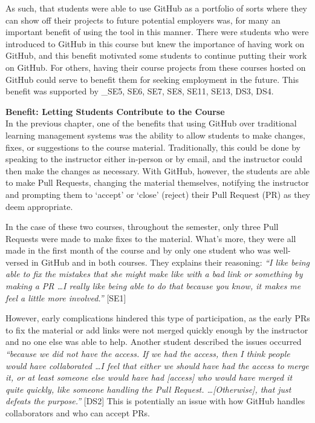 As such, that students were able to use GitHub as a portfolio of sorts where they can show off their projects to future potential employers was, for many an important benefit of using the tool in this manner. There were students who were introduced to GitHub in this course but knew the importance of having work on GitHub, and this benefit motivated some students to continue putting their work on GitHub. For others, having their course projects from these courses hosted on GitHub could serve to benefit them for seeking employment in the future. This benefit was supported by _{SE5, SE6, SE7, SE8, SE11, SE13, DS3, DS4}.

\textbf{Benefit: Letting Students Contribute to the Course} \\ %
In the previous chapter, one of the benefits that using GitHub over traditional learning management systems was the ability to allow students to make changes, fixes, or suggestions to the course material. Traditionally, this could be done by speaking to the instructor either in-person or by email, and the instructor could then make the changes as necessary. With GitHub, however, the students are able to make Pull Requests, changing the material themselves, notifying the instructor and prompting them to `accept' or `close' (reject) their Pull Request (PR) as they deem appropriate.

In the case of these two courses, throughout the semester, only three Pull Requests were made to make fixes to the material. What's more, they were all made in the first month of the course and by only one student who was well-versed in GitHub and in both courses. They explains their reasoning: \textit{``I like being able to fix the mistakes that she might make like with a bad link or something by making a PR \ldots I really like being able to do that because you know, it makes me feel a little more involved.''} [SE1]

However, early complications hindered this type of participation, as the early PRs to fix the material or add links were not merged quickly enough by the instructor and no one else was able to help. Another student described the issues occurred \textit{``because we did not have the access. If we had the access, then I think people would have collaborated \ldots I feel that either we should have had the access to merge it, or at least someone else would have had [access] who would have merged it quite quickly, like someone handling the Pull Request. \ldots [Otherwise], that just defeats the purpose.''} [DS2] This is potentially an issue with how GitHub handles collaborators and who can accept PRs.

